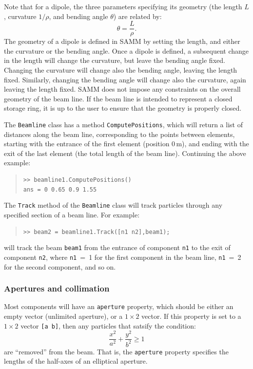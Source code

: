 \documentclass[11pt,twoside,a4paper]{article}
\begin{document}
Note that for a dipole, the three parameters specifying its geometry (the length
$L$, curvature $1/\rho$, and bending angle $\theta$) are related by:
\[
\theta = \frac{L}{\rho}.
\]
The geometry of a dipole is defined in SAMM by setting the length, and either
the curvature or the bending angle.  Once a dipole is defined, a subsequent
change in the length will change the curvature, but leave the bending angle fixed.
Changing the curvature will change also the bending angle, leaving the length
fixed.  Similarly, changing the bending angle will change also the curvature,
again leaving the length fixed.  SAMM does not impose any constraints on the
overall geometry of the beam line.  If the beam line is intended to represent
a closed storage ring, it is up to the user to ensure that the geometry is
properly closed.

The \texttt{Beamline} class has a method \texttt{ComputePositions}, which will
return a list of distances along the beam line, corresponding to the points
between elements, starting with the entrance of the first element (position 0\,m),
and ending with the exit of the last element (the total length of the beam line).
Continuing the above example:
\begin{quote}
\texttt{>> beamline1.ComputePositions() \\
ans = 0 0.65 0.9 1.55}
\end{quote}

The \texttt{Track} method of the \texttt{Beamline} class will track particles
through any specified section of a beam line.  For example:
\begin{quote}
\texttt{>> beam2 = beamline1.Track([n1 n2],beam1);}
\end{quote}
will track the beam \texttt{beam1} from the entrance of component \texttt{n1}
to the exit of component \texttt{n2}, where \texttt{n1}~=~1 for the first component
in the beam line, \texttt{n1}~=~2 for the second component, and so on.


\subsubsection{Apertures and collimation\label{sec:apertures}}

Most components will have an \texttt{aperture} property, which should be either
an empty vector (unlimited aperture), or a $1\times 2$ vector.  If this property
is set to a $1\times 2$ vector \texttt{[a b]}, then any particles that satsify the
condition:
\[
\frac{x^2}{a^2} + \frac{y^2}{b^2} \ge 1
\]
are ``removed'' from the beam.  That is, the \texttt{aperture} property
specifies the lengths of the half-axes of an elliptical aperture.
\end{document}
